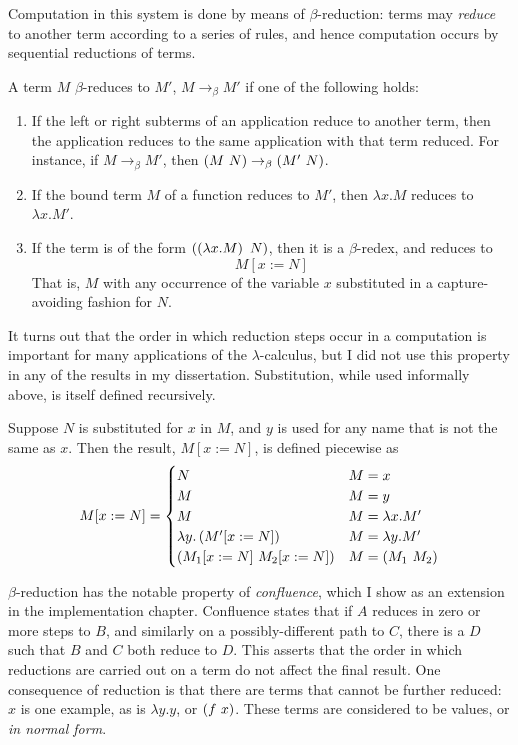 Computation in this system is done by means of \(\beta\)-reduction: terms may \emph{reduce} to another term according to a series of rules, and hence computation occurs by sequential reductions of terms.

\begin{definition}
A term \(M\) \(\beta\)-reduces to \(M'\), \(M \to_\beta M'\) if one of the following holds:
\begin{enumerate}
\item
If the left or right subterms of an application reduce to another term, then the application reduces to the same application with that term reduced.
For instance, if \(M \to_\beta M'\), then \(\wrap{M\ N} \to_\beta \wrap{M'\ N}\).
\item
If the bound term \(M\) of a function reduces to \(M'\), then \(\lambda x.M\) reduces to \(\lambda x.M'\).
\item
If the term is of the form \(\left(\left(\lambda x.M\right)\ N\right)\), then it is a \(\beta\)-redex, and reduces to
\[
M[x := N]
\]
That is, \(M\) with any occurrence of the variable \(x\) substituted in a capture-avoiding fashion for \(N\).
\end{enumerate}
\end{definition}

It turns out that the order in which reduction steps occur in a computation is important for many applications of the \(\lambda\)-calculus, but I did not use this property in any of the results in my dissertation.
Substitution, while used informally above, is itself defined recursively.

\begin{definition}
Suppose \(N\) is substituted for \(x\) in \(M\), and \(y\) is used for any name that is not the same as \(x\).
Then the result, \(M[x := N]\), is defined piecewise as
\[
M[x := N] =
\begin{cases}
N & M = x\\
M & M = y\\
M & M = \lambda x. M'\\
\lambda y. \left(M'[x := N]\right) & M = \lambda y. M'\\
\left(M_1[x := N]\  M_2[x := N]\right) & M = \left(M_1\ M_2\right)\\
\end{cases}
\]
\end{definition}

\(\beta\)-reduction has the notable property of \emph{confluence}, which I show as an extension in the implementation chapter.
Confluence states that if \(A\) reduces in zero or more steps to \(B\), and similarly on a possibly-different path to \(C\), there is a \(D\) such that \(B\) and \(C\) both reduce to \(D\).
This asserts that the order in which reductions are carried out on a term do not affect the final result.
One consequence of reduction is that there are terms that cannot be further reduced: \(x\) is one example, as is \(\lambda y.y\), or \(\left(f\ x\right)\).
These terms are considered to be values, or \emph{in normal form}.

